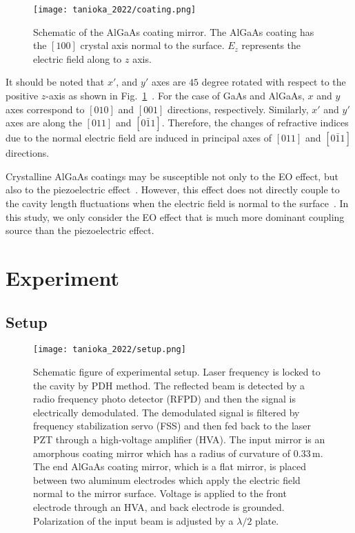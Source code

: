 \begin{figure}[htbp]
    \centering 
\texttt{[image: tanioka\_2022/coating.png]}
\caption{
Schematic of the AlGaAs coating mirror.
The AlGaAs coating has the $[100]$ crystal axis normal to the surface.
$E_z$ represents the electric field along to $z$ axis.
}
\label{fig.coating}
\end{figure}

It should be noted that $x'$, and $y'$ axes are $45$ degree rotated with respect to the positive $z$-axis as shown in Fig.~\ref{fig.coating}~\cite{Namba1961, yariv}.
For the case of GaAs and AlGaAs, $x$ and $y$ axes correspond to $[010]$ and $[001]$ directions, respectively.
Similarly, $x'$ and $y'$ axes are along the $[011]$ and $[0\bar{1}1]$.
Therefore, the changes of refractive indices due to the normal electric field are induced in principal axes of $[011]$ and $[0\bar{1}1]$ directions.

Crystalline AlGaAs coatings may be susceptible not only to the EO effect, but also to the piezoelectric effect~\cite{nye}.
However, this effect does not directly couple to the cavity length fluctuations when the electric field is normal to the surface~\cite{Fricke1991}.
In this study, we only consider the EO effect that is much more dominant coupling source than the piezoelectric effect.

\section{Experiment}

\subsection{Setup}

\begin{figure}[htbp]
\texttt{[image: tanioka\_2022/setup.png]}
\caption{
Schematic figure of experimental setup.
Laser frequency is locked to the cavity by PDH method. The reflected beam is detected by a radio frequency photo detector (RFPD) and then the signal is electrically demodulated. The demodulated signal is filtered by frequency stabilization servo (FSS) and then fed back to the laser PZT through a high-voltage amplifier (HVA).
The input mirror is an amorphous coating mirror which has a radius of curvature of $0.33 \, \mathrm{m}$.
The end AlGaAs coating mirror, which is a flat mirror, is placed between two aluminum electrodes which apply the electric field normal to the mirror surface.
Voltage is applied to the front electrode through an HVA, and back electrode is grounded.
Polarization of the input beam is adjusted by a $\lambda/2$ plate.
}
\label{fig.setup}
\end{figure}

